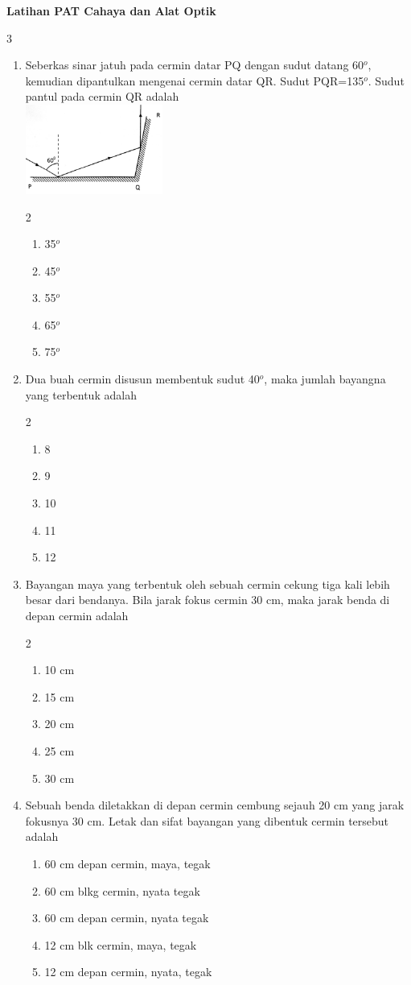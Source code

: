 \documentclass[10pt,a4paper]{extarticle}
\newcommand*\pilgan[1]{
\begin{enumerate}[label=\Alph*., itemsep=0pt,topsep=0pt,leftmargin=*,align=Center] #1 
\end{enumerate}}
\newcommand{\pilgani}[1]{                            \vspace{-0.3cm}\begin{multicols}{2}
 \begin{enumerate}[label=\Alph*., itemsep=0pt,topsep=0pt,leftmargin=*,align=Center]#1                     \end{enumerate}
 \phantom{ini cuma sapi, wedus, dan ayam}
 \end{multicols}}
\begin{document}
 \textbf{Latihan PAT Cahaya dan Alat Optik} \phantom{ini nama siswa yang aaamengerjakan soal kuis ini }  

\begin{multicols}{3}\raggedcolumns

\begin{enumerate}
\item Seberkas sinar jatuh pada cermin datar PQ dengan sudut datang 60$^o$, kemudian dipantulkan mengenai cermin datar QR. Sudut PQR=135$^o$. Sudut pantul pada cermin QR adalah\\
\includegraphics[width=4.5cm]{pic/lab-2}
\pilgani{
   \item 35$^o$
   \item 45$^o$
   \item 55$^o$
   \item 65$^o$
   \item 75$^o$}

\item Dua buah cermin disusun membentuk sudut 40$^o$, maka jumlah bayangna yang terbentuk adalah
\pilgani{
   \item 8 
   \item 9
   \item 10
   \item 11
   \item 12}
\item Bayangan maya yang terbentuk oleh sebuah cermin cekung tiga kali lebih besar dari bendanya. Bila jarak fokus cermin 30 cm, maka jarak benda di depan cermin adalah
\pilgani{
   \item 10 cm
   \item 15 cm
   \item 20 cm
   \item 25 cm
   \item 30 cm}
\vspace{2cm}

\item Sebuah benda diletakkan di depan cermin cembung sejauh 20 cm yang jarak fokusnya 30 cm. Letak dan sifat bayangan yang dibentuk cermin tersebut adalah
\pilgan{
   \item 60 cm depan cermin, maya, tegak
   \item 60 cm blkg cermin, nyata tegak
   \item 60 cm depan cermin, nyata tegak
   \item 12 cm blk cermin, maya, tegak
   \item 12 cm depan cermin, nyata, tegak
}
\vspace{2cm}


\end{enumerate}
\end{multicols}
\end{document}
